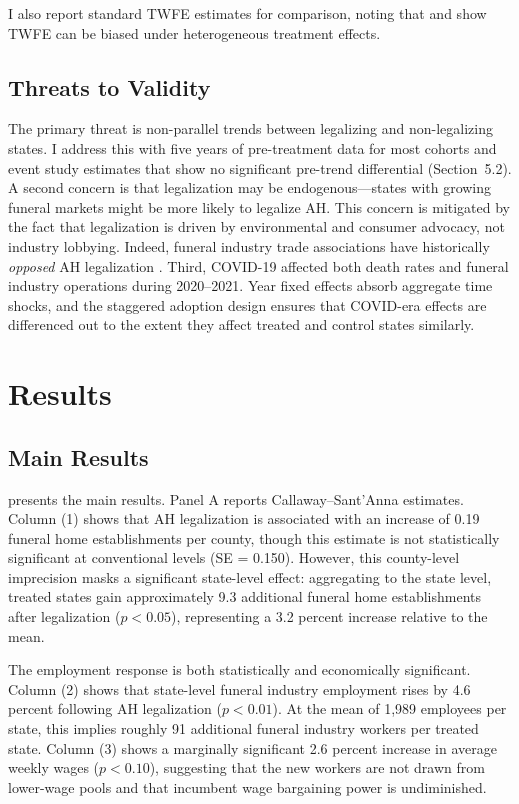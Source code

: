 \documentclass[12pt]{article}
\begin{document}
I also report standard TWFE estimates for comparison, noting that \citet{goodmanbacon2021difference} and \citet{baker2022much} show TWFE can be biased under heterogeneous treatment effects.

\subsection{Threats to Validity}

The primary threat is non-parallel trends between legalizing and non-legalizing states. I address this with five years of pre-treatment data for most cohorts and event study estimates that show no significant pre-trend differential (Section~5.2). A second concern is that legalization may be endogenous---states with growing funeral markets might be more likely to legalize AH. This concern is mitigated by the fact that legalization is driven by environmental and consumer advocacy, not industry lobbying. Indeed, funeral industry trade associations have historically \emph{opposed} AH legalization \citep{harrington2007effects}. Third, COVID-19 affected both death rates and funeral industry operations during 2020--2021. Year fixed effects absorb aggregate time shocks, and the staggered adoption design ensures that COVID-era effects are differenced out to the extent they affect treated and control states similarly.


\section{Results}

\subsection{Main Results}



 presents the main results. Panel A reports Callaway--Sant'Anna estimates. Column (1) shows that AH legalization is associated with an increase of 0.19 funeral home establishments per county, though this estimate is not statistically significant at conventional levels (SE = 0.150). However, this county-level imprecision masks a significant state-level effect: aggregating to the state level, treated states gain approximately 9.3 additional funeral home establishments after legalization ($p < 0.05$), representing a 3.2 percent increase relative to the mean.

The employment response is both statistically and economically significant. Column (2) shows that state-level funeral industry employment rises by 4.6 percent following AH legalization ($p < 0.01$). At the mean of 1,989 employees per state, this implies roughly 91 additional funeral industry workers per treated state. Column (3) shows a marginally significant 2.6 percent increase in average weekly wages ($p < 0.10$), suggesting that the new workers are not drawn from lower-wage pools and that incumbent wage bargaining power is undiminished.
\end{document}
